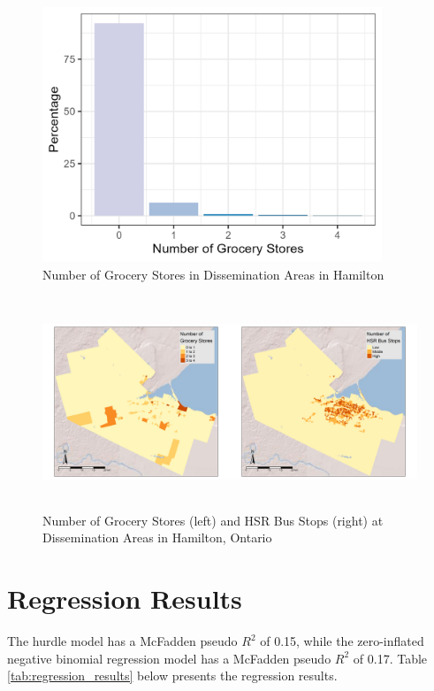 \documentclass[preprint, 3p,
authoryear]{elsarticle} %
\begin{document}
\begin{figure}

{\centering \includegraphics[width=4in,height=3in]{./images/dep} 

}

\caption{\label{fig:dep}Number of Grocery Stores in Dissemination Areas in Hamilton}\label{fig:unnamed-chunk-10}
\end{figure}

\begin{figure}

{\centering \includegraphics[width=6in,height=2.5in]{./images/descriptive} 

}

\caption{\label{fig:descriptive}Number of Grocery Stores (left) and HSR Bus Stops (right) at Dissemination Areas in Hamilton, Ontario}\label{fig:unnamed-chunk-13}
\end{figure}

\section{Regression Results}\label{regression-results}

The hurdle model has a McFadden pseudo \(R^2\) of 0.15, while the
zero-inflated negative binomial regression model has a McFadden pseudo
\(R^2\) of 0.17. Table \ref{tab:regression_results} below presents the
regression results.
\end{document}

